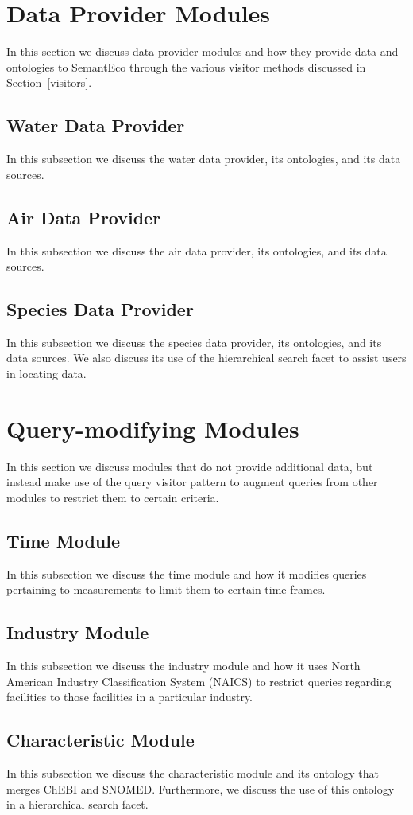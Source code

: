 \documentclass[letterpaper]{report}
\begin{document}
\section{Data Provider Modules}
In this section we discuss data provider modules and how they provide data and ontologies to SemantEco through the various visitor methods discussed in Section~\ref{visitors}.
\subsection{Water Data Provider}
In this subsection we discuss the water data provider, its ontologies, and its data sources.
\subsection{Air Data Provider}
In this subsection we discuss the air data provider, its ontologies, and its data sources.
\subsection{Species Data Provider}
In this subsection we discuss the species data provider, its ontologies, and its data sources. We also discuss its use of the hierarchical search facet to assist users in locating data.
\section{Query-modifying Modules}
In this section we discuss modules that do not provide additional data, but instead make use of the query visitor pattern to augment queries from other modules to restrict them to certain criteria.
\subsection{Time Module}
In this subsection we discuss the time module and how it modifies queries pertaining to measurements to limit them to certain time frames.
\subsection{Industry Module}
In this subsection we discuss the industry module and how it uses North American Industry Classification System (NAICS) to restrict queries regarding facilities to those facilities in a particular industry.
\subsection{Characteristic Module}
In this subsection we discuss the characteristic module and its ontology that merges ChEBI and SNOMED. Furthermore, we discuss the use of this ontology in a hierarchical search facet.
\end{document}
